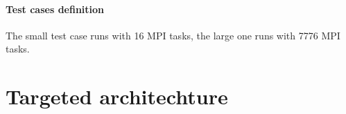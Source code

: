 \subsection{Test cases definition}
The small test case runs with 16 MPI tasks, the large one runs with 7776 MPI tasks.


\part{Targeted architechture}




